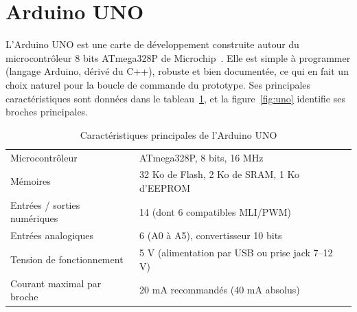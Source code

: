 \section{Arduino UNO}

L'Arduino UNO est une carte de développement construite autour du microcontrôleur 8 bits ATmega328P de
Microchip~\cite{arduinouno}. Elle est simple à programmer (langage Arduino, dérivé du C++), robuste et bien
documentée, ce qui en fait un choix naturel pour la boucle de commande du prototype. Ses principales
caractéristiques sont données dans le tableau~\ref{tab:uno}, et la figure~\ref{fig:uno} identifie ses broches
principales.

\begin{table}[H]
\centering\small
\caption{Caractéristiques principales de l'Arduino UNO}
\label{tab:uno}
\begin{tabular}{ll}
\toprule
Microcontrôleur & ATmega328P, 8 bits, 16 MHz \\
Mémoires & 32 Ko de Flash, 2 Ko de SRAM, 1 Ko d'EEPROM \\
Entrées / sorties numériques & 14 (dont 6 compatibles MLI/PWM) \\
Entrées analogiques & 6 (A0 à A5), convertisseur 10 bits \\
Tension de fonctionnement & 5 V (alimentation par USB ou prise jack 7--12 V) \\
Courant maximal par broche & 20 mA recommandés (40 mA absolus) \\
\bottomrule
\end{tabular}
\end{table}


